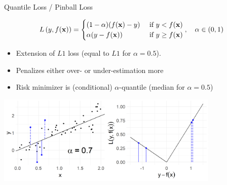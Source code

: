 \documentclass[11pt,compress,t,notes=noshow, xcolor=table]{beamer}
\begin{document}
\begin{vbframe}{Quantile Loss / Pinball Loss}

$$
L\left(y, f(\mathbf{x})\right) = \begin{cases} (1 - \alpha) (f(\mathbf{x}) - y) & \text{ if } y < f(\mathbf{x})\\
\alpha (y - f(\mathbf{x})) & \text{ if } y \ge f(\mathbf{x})
\end{cases}, \quad \alpha \in (0, 1)
$$

\begin{itemize}
\item Extension of $L1$ loss (equal to $L1$ for $\alpha = 0.5$).
\item Penalizes either over- or under-estimation more
\item Risk minimizer is (conditional) 
    $\alpha$-quantile (median for $\alpha=0.5$)
\end{itemize}

\vfill

\begin{center}
\includegraphics[width = 0.8\textwidth]{figure/loss_quantile.png}
\end{center}

\end{vbframe}
\end{document}
